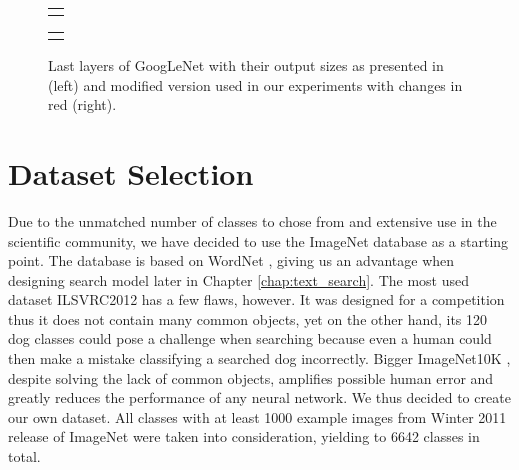 \begin{figure}
	\centering
	
	\begin{tabular}{@{}c@{}}
		\subfloat{
			
		}
	\end{tabular}
	\begin{tabular}{@{}c@{}}
		\subfloat{
			
		}
	\end{tabular}
	
	\caption[Last layers of GoogLeNet]{Last layers of GoogLeNet with their output sizes as presented in \cite{szegedy2015going} (left) and modified version used in our experiments with changes in red (right).}
	\label{fig:inception_end}
\end{figure}



\section{Dataset Selection}\label{sec:dataset_selection}
Due to the unmatched number of classes to chose from and extensive use in the scientific community, we have decided to use the ImageNet database \cite{ILSVRC15} as a starting point. The database is based on WordNet \cite{WordNet}, giving us an advantage when designing search model later in Chapter \ref{chap:text_search}. The most used dataset ILSVRC2012 has a few flaws, however. It was designed for a competition thus it does not contain many common objects, yet on the other hand, its 120 dog classes could pose a challenge when searching because even a human could then make a mistake classifying a searched dog incorrectly. Bigger ImageNet10K \cite{deng2010does}, despite solving the lack of common objects, amplifies possible human error and greatly reduces the performance of any neural network. We thus decided to create our own dataset. All classes with at least 1000 example images from Winter 2011 release of ImageNet were taken into consideration, yielding to 6642 classes in total.


